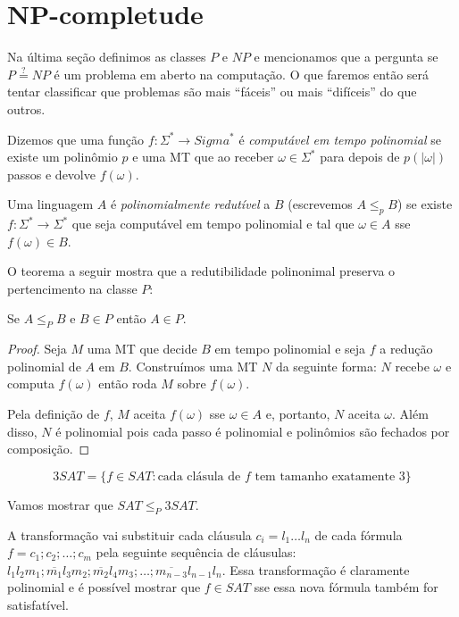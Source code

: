 \section{NP-completude}
\label{sec:np-completude}

Na última seção definimos as classes $P$ e $NP$ e mencionamos que a pergunta se $P \stackrel{?}{=} NP$ é um problema em aberto na computação.
O que faremos então será tentar classificar que problemas são mais ``fáceis'' ou mais ``difíceis'' do que outros.

Dizemos que uma função $f : \Sigma^* \to Sigma^*$ é {\em computável em tempo polinomial} se existe um polinômio $p$ e uma MT que ao receber $\omega \in \Sigma^*$ para depois de $p(|\omega|)$ passos e devolve $f(\omega)$.

Uma linguagem $A$ é {\em polinomialmente redutível} a $B$ (escrevemos $A \leq_p B$) se existe $f: \Sigma^* \to \Sigma^*$ que seja computável em tempo polinomial e tal que $\omega \in A$ sse $f(\omega) \in B$.

O teorema a seguir mostra que a redutibilidade polinonimal preserva o pertencimento na classe $P$:

\begin{theorem}
  Se $A \leq_P B$ e $B \in P$ então $A \in P$.
\end{theorem}
\begin{proof}
  Seja $M$ uma MT que decide $B$ em tempo polinomial e seja $f$ a redução polinomial de $A$ em $B$.
  Construímos uma MT $N$ da seguinte forma: $N$ recebe $\omega$ e computa $f(\omega)$ então roda $M$ sobre $f(\omega)$.

  Pela definição de $f$, $M$ aceita $f(\omega)$ sse $\omega \in A$ e, portanto, $N$ aceita $\omega$.
  Além disso, $N$ é polinomial pois cada passo é polinomial e polinômios são fechados por composição.
\end{proof}

\begin{example}
  \begin{displaymath}
    3SAT = \{f \in SAT : \textrm{cada clásula de $f$ tem tamanho exatamente 3}\}
  \end{displaymath}

  Vamos mostrar que $SAT \leq_P 3SAT$.

  A transformação vai substituir cada cláusula $c_i = l_1 \dots l_n$ de cada fórmula $f = c_1;c_2; \dots; c_m$ pela seguinte sequência de cláusulas: $l_1l_2m_1;\overline{m_1}l_3m_2;\overline{m_2}l_4m_3; \dots ; \overline{m_{n-3}}l_{n-1}l_n$.
  Essa transformação é claramente polinomial e é possível mostrar que $f \in SAT$ sse essa nova fórmula também for satisfatível.
\end{example}

